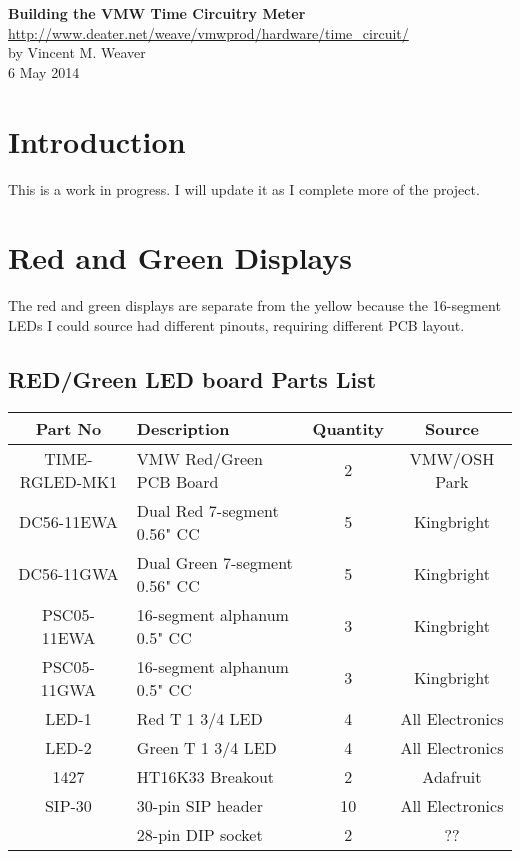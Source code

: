 \documentclass[11pt]{article}
\begin{document}
\begin{center}
{\Large \bf Building the VMW Time Circuitry Meter}\\
\url{http://www.deater.net/weave/vmwprod/hardware/time_circuit/}\\
by Vincent M. Weaver\\
6 May 2014
\end{center}


\section{Introduction}

This is a work in progress.  I will update it as I complete more
of the project.


\pagebreak
\section{Red and Green Displays}

The red and green displays are separate from the yellow because
the 16-segment LEDs I could source had different pinouts, requiring
different PCB layout.

\subsection{RED/Green LED board Parts List}

\begin{tabular}{|c|l|c|c|}
\hline
Part No   &  Description    &  Quantity    &   Source \\
\hline
\hline
TIME-RGLED-MK1 & VMW Red/Green PCB Board       & 2 & VMW/OSH Park\\ %
\hline
DC56-11EWA     & Dual Red 7-segment 0.56" CC   & 5 & Kingbright\\ %
\hline
DC56-11GWA     & Dual Green 7-segment 0.56" CC & 5 & Kingbright\\ %
\hline
PSC05-11EWA    & 16-segment alphanum 0.5" CC   & 3 & Kingbright\\ %
\hline
PSC05-11GWA    & 16-segment alphanum 0.5" CC   & 3 & Kingbright\\ %
\hline
LED-1          & Red T 1 3/4 LED               & 4 & All Electronics\\ %
\hline
LED-2          & Green T 1 3/4 LED             & 4 & All Electronics\\ %
\hline
1427           & HT16K33 Breakout              & 2 & Adafruit\\ %
\hline
SIP-30	       & 30-pin SIP header             & 10 & All Electronics\\ %
\hline
               & 28-pin DIP socket             & 2 & ?? \\ %
\hline
\end{tabular}
\end{document}
